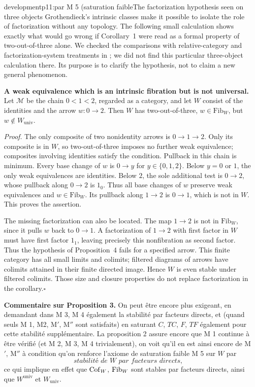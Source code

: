 \begin{dcomment}{development}{p11:par M 5 (saturation faible}{The factorization hypothesis seen on three objects}
Grothendieck's intrinsic classes make it possible to isolate the role of factorization without any topology. The following small calculation shows exactly what would go wrong if Corollary~1 were read as a formal property of two-out-of-three alone. We checked the comparisons with relative-category and factorization-system treatments in \citet{Riehl2014,Rosicky2021Remarks}; we did not find this particular three-object calculation there. Its purpose is to clarify the hypothesis, not to claim a new general phenomenon.

\textbf{A weak equivalence which is an intrinsic fibration but is not universal.}\ours
Let $\mathcal M$ be the chain $0<1<2$, regarded as a category, and let $W$ consist of the identities and the arrow $w:0\to2$. Then $W$ has two-out-of-three, $w\in\mathrm{Fib}_W$, but $w\notin W_{\mathrm{univ}}$.

\emph{Proof.} The only composite of two nonidentity arrows is $0\to1\to2$. Only its composite is in $W$, so two-out-of-three imposes no further weak equivalence; composites involving identities satisfy the condition. Pullback in this chain is minimum. Every base change of $w$ is $0\to y$ for $y\in\{0,1,2\}$. Below $y=0$ or $1$, the only weak equivalences are identities. Below $2$, the sole additional test is $0\to2$, whose pullback along $0\to2$ is $1_0$. Thus all base changes of $w$ preserve weak equivalences and $w\in\mathrm{Fib}_W$. Its pullback along $1\to2$ is $0\to1$, which is not in $W$. This proves the assertion.

The missing factorization can also be located. The map $1\to2$ is not in $\mathrm{Fib}_W$, since it pulls $w$ back to $0\to1$. A factorization of $1\to2$ with first factor in $W$ must have first factor $1_1$, leaving precisely this nonfibration as second factor. Thus the hypothesis of Proposition~4 fails for a specified arrow. This finite category has all small limits and colimits; filtered diagrams of arrows have colimits attained in their finite directed image. Hence $W$ is even stable under filtered colimits. Those size and closure properties do not replace factorization in the corollary.\hfill$\square$
\end{dcomment}


\textbf{Commentaire sur Proposition 3.} On peut être encore plus exigeant, en demandant dans M 3, M 4 également la stabilité par facteurs directs, et (quand seuls M 1, M2, M$'$, M$''$ %
sont satisfaits) en saturant $C$, $TC$, $F$, $TF$ également pour cette stabilité supplémentaire. La proposition 2 assure encore que M 1 continue à être vérifié (et M 2, M 3, M 4 trivialement), on voit qu'il en est ainsi encore de M$'$, M$''$ à condition qu'on renforce l'axiome de saturation faible M 5 sur $W$ par
\[
\textit{stabilité de $W$ par facteurs directs,}
\]
ce qui implique en effet que $\mathrm{Cof}_W$, $\mathrm{Fib}_W$ sont stables par facteurs directs, ainsi que $W^{\mathrm{univ}}$ et $W_{\mathrm{univ}}$.

